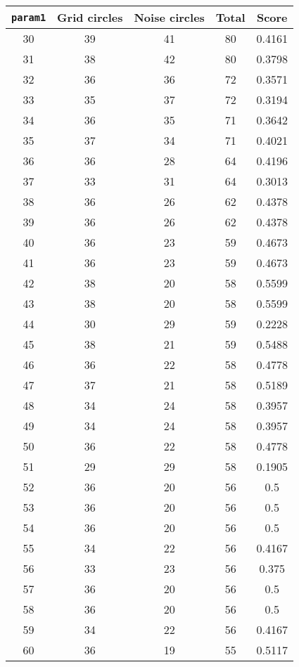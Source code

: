 \documentclass[letterpaper, 12pt]{article}
\begin{document}
\begin{longtable}{|c|c|c|c|c|}
\hline
\textbf{\texttt{param1}} & \textbf{Grid circles} & \textbf{Noise circles} & \textbf{Total} & \textbf{Score} \\
\hline
30 & 39 & 41 & 80 & 0.4161 \\
\hline
31 & 38 & 42 & 80 & 0.3798 \\
\hline
32 & 36 & 36 & 72 & 0.3571 \\
\hline
33 & 35 & 37 & 72 & 0.3194 \\
\hline
34 & 36 & 35 & 71 & 0.3642 \\
\hline
35 & 37 & 34 & 71 & 0.4021 \\
\hline
36 & 36 & 28 & 64 & 0.4196 \\
\hline
37 & 33 & 31 & 64 & 0.3013 \\
\hline
38 & 36 & 26 & 62 & 0.4378 \\
\hline
39 & 36 & 26 & 62 & 0.4378 \\
\hline
40 & 36 & 23 & 59 & 0.4673 \\
\hline
41 & 36 & 23 & 59 & 0.4673 \\
\hline
42 & 38 & 20 & 58 & 0.5599 \\
\hline
43 & 38 & 20 & 58 & 0.5599 \\
\hline
44 & 30 & 29 & 59 & 0.2228 \\
\hline
45 & 38 & 21 & 59 & 0.5488 \\
\hline
46 & 36 & 22 & 58 & 0.4778 \\
\hline
47 & 37 & 21 & 58 & 0.5189 \\
\hline
48 & 34 & 24 & 58 & 0.3957 \\
\hline
49 & 34 & 24 & 58 & 0.3957 \\
\hline
50 & 36 & 22 & 58 & 0.4778 \\
\hline
51 & 29 & 29 & 58 & 0.1905 \\
\hline
52 & 36 & 20 & 56 & 0.5 \\
\hline
53 & 36 & 20 & 56 & 0.5 \\
\hline
54 & 36 & 20 & 56 & 0.5 \\
\hline
55 & 34 & 22 & 56 & 0.4167 \\
\hline
56 & 33 & 23 & 56 & 0.375 \\
\hline
57 & 36 & 20 & 56 & 0.5 \\
\hline
58 & 36 & 20 & 56 & 0.5 \\
\hline
59 & 34 & 22 & 56 & 0.4167 \\
\hline
60 & 36 & 19 & 55 & 0.5117 \\

\end{longtable}
\end{document}
